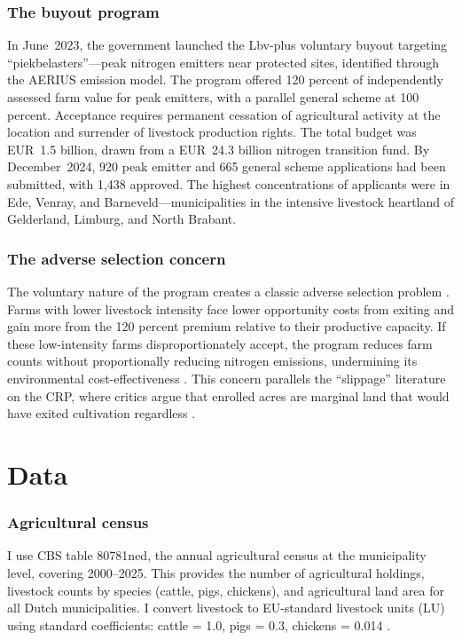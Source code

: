\documentclass[12pt]{article}
\begin{document}
\subsubsection*{The buyout program} In June~2023, the government launched the Lbv-plus voluntary buyout targeting ``piekbelasters''---peak nitrogen emitters near protected sites, identified through the AERIUS emission model. The program offered 120 percent of independently assessed farm value for peak emitters, with a parallel general scheme at 100 percent. Acceptance requires permanent cessation of agricultural activity at the location and surrender of livestock production rights. The total budget was EUR~1.5 billion, drawn from a EUR~24.3 billion nitrogen transition fund. By December~2024, 920 peak emitter and 665 general scheme applications had been submitted, with 1,438 approved. The highest concentrations of applicants were in Ede, Venray, and Barneveld---municipalities in the intensive livestock heartland of Gelderland, Limburg, and North Brabant.

\subsubsection*{The adverse selection concern} The voluntary nature of the program creates a classic adverse selection problem \citep{akerlof1970market}. Farms with lower livestock intensity face lower opportunity costs from exiting and gain more from the 120 percent premium relative to their productive capacity. If these low-intensity farms disproportionately accept, the program reduces farm counts without proportionally reducing nitrogen emissions, undermining its environmental cost-effectiveness \citep{dupraz2003economics, mason2012voluntary}. This concern parallels the ``slippage'' literature on the CRP, where critics argue that enrolled acres are marginal land that would have exited cultivation regardless \citep{wu2001slippage, cox2007voluntary}.


\section{Data}
\label{sec:data}

\subsubsection*{Agricultural census} I use CBS table 80781ned, the annual agricultural census at the municipality level, covering 2000--2025. This provides the number of agricultural holdings, livestock counts by species (cattle, pigs, chickens), and agricultural land area for all Dutch municipalities. I convert livestock to EU-standard livestock units (LU) using standard coefficients: cattle = 1.0, pigs = 0.3, chickens = 0.014 \citep{roberts2003distribution}.
\end{document}
